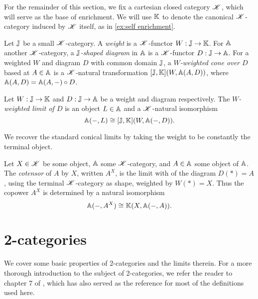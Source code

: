 \documentclass[../thesis.tex]{subfiles}
\begin{document}
For the remainder of this section, we fix a cartesian closed category ${\mathscr{K}}$, which will serve as the base of enrichment.
We will use ${\mathbb{K}}$ to denote the canonical ${\mathscr{K}}$-category induced by ${\mathscr{K}}$ itself, as in \cref{ex:self enrichment}.

\begin{definition}
  Let ${\mathbb{J}}$ be a small ${\mathscr{K}}$-category. A \emph{weight} is a ${\mathscr{K}}$-functor $W : {\mathbb{J}} \to {\mathbb{K}}$. For ${\mathbb{A}}$ another ${\mathscr{K}}$-category,
  a \emph{${\mathbb{J}}$-shaped diagram} in ${\mathbb{A}}$ is a ${\mathscr{K}}$-functor $D : {\mathbb{J}} \to {\mathbb{A}}$. For a weighted $W$ and diagram $D$ with common
  domain ${\mathbb{J}}$, a \emph{$W$-weighted cone over $D$} based at $A \in {\mathbb{A}}$ is a ${\mathscr{K}}$-natural transformation $[{\mathbb{J}}, {\mathbb{K}}](W,
  {\mathbb{A}}(A,D))$, where ${\mathbb{A}}(A,D) = {\mathbb{A}}(A,-) \circ D$.
\end{definition}

\begin{definition}
  Let $W : {\mathbb{J}} \to {\mathbb{K}}$ and $D : {\mathbb{J}} \to {\mathbb{A}}$ be a weight and diagram respectively. The \emph{$W$-weighted limit of $D$} is
  an object $L \in {\mathbb{A}}$ and a ${\mathscr{K}}$-natural isomorphism
  \[{\mathbb{A}}(-,L) \cong [{\mathbb{J}},{\mathbb{K}}](W,{\mathbb{A}}(-,D)).\]
\end{definition}

\begin{example}
  We recover the standard conical limits by taking the weight to be constantly the terminal object.
\end{example}

\begin{example}[Cotensors]
  Let $X \in {\mathscr{K}}$ be some object, ${\mathbb{A}}$ some ${\mathscr{K}}$-category, and $A \in {\mathbb{A}}$ some object of ${\mathbb{A}}$. The \emph{cotensor}
  of $A$ by $X$, written $A^X$, is the limit with of the diagram $D(*) = A$, using the terminal ${\mathscr{K}}$-category as shape,
  weighted by $W(*) = X$. Thus the copower $A^X$ is determined by a natural isomorphism
  \[{\mathbb{A}}(-,A^X) \cong {\mathbb{K}}(X,{\mathbb{A}}(-,A)).\]
\end{example}

\section{2-categories}
\label{sec:2-cats}
We cover some basic properties of 2-categories and the limits therein. For a more thorough introduction to the subject of
2-categories, we refer the reader to chapter 7 of \cite{borceux1994a}, which has also served as the reference for most of
the definitions used here.
\end{document}
